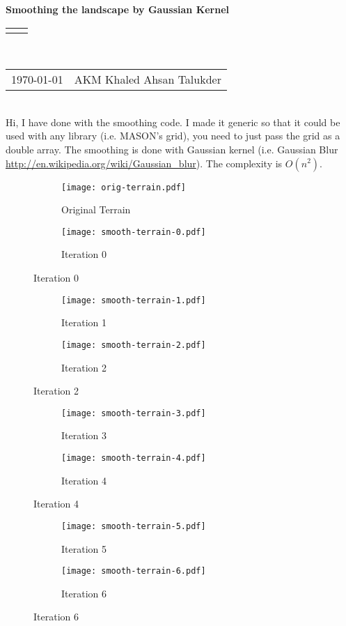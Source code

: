 \documentclass[10pt]{article}
\renewcommand{\title}[1]{\textbf{#1}\\}
\renewcommand{\line}{\begin{tabularx}{\textwidth}{X>{\raggedleft}X}\hline\\\end{tabularx}\\[-0.5cm]}
\newcommand{\leftright}[2]{\begin{tabularx}{\textwidth}{X>{\raggedleft}X}#1%
& #2\\\end{tabularx}\\[-0.5cm]}
\begin{document}
\title{Smoothing the landscape by Gaussian Kernel}
\line
\leftright{\vspace{0.5pt}\today}{\vspace{0.5pt}AKM Khaled Ahsan Talukder} %

\vspace{10pt}
Hi, I have done with the smoothing code. I made it generic so that it could be used with any library (i.e. MASON's grid), you need to just pass the grid as a double array. The smoothing is done with Gaussian kernel (i.e. Gaussian Blur \url{http://en.wikipedia.org/wiki/Gaussian_blur}). The complexity is $O(n^2)$.
%
\begin{figure}[H]
\centering
	\begin{subfigure}[b]{0.5\textwidth}
		\texttt{[image: orig-terrain.pdf]}
		\caption{Original Terrain}
	\end{subfigure}%
	\begin{subfigure}[b]{0.5\textwidth}
		\texttt{[image: smooth-terrain-0.pdf]}
		\caption{Iteration 0}
	\end{subfigure}%
\end{figure}
\begin{figure}[H]
	\begin{subfigure}[b]{0.5\textwidth}
		\texttt{[image: smooth-terrain-1.pdf]}
		\caption{Iteration 1}
	\end{subfigure}
	\begin{subfigure}[b]{0.5\textwidth}
		\texttt{[image: smooth-terrain-2.pdf]}
		\caption{Iteration 2}
	\end{subfigure}
\end{figure}
\begin{figure}[H]
	\begin{subfigure}[b]{0.5\textwidth}
		\texttt{[image: smooth-terrain-3.pdf]}
		\caption{Iteration 3}
	\end{subfigure}
	\begin{subfigure}[b]{0.5\textwidth}
		\texttt{[image: smooth-terrain-4.pdf]}
		\caption{Iteration 4}
	\end{subfigure}
\end{figure}
\begin{figure}[H]
	\begin{subfigure}[b]{0.5\textwidth}
		\texttt{[image: smooth-terrain-5.pdf]}
		\caption{Iteration 5}
	\end{subfigure}
	\begin{subfigure}[b]{0.5\textwidth}
		\texttt{[image: smooth-terrain-6.pdf]}
		\caption{Iteration 6}
	\end{subfigure}
\end{figure}
\end{document}
